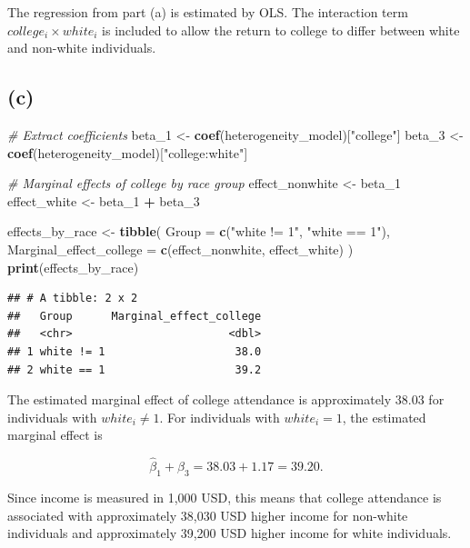 \documentclass[
]{article}
\newenvironment{Shaded}{\begin{snugshade}}{\end{snugshade}}
\newcommand{\AttributeTok}[1]{\textcolor[rgb]{0.13,0.29,0.53}{#1}}
\newcommand{\CommentTok}[1]{\textcolor[rgb]{0.56,0.35,0.01}{\textit{#1}}}
\newcommand{\FunctionTok}[1]{\textcolor[rgb]{0.13,0.29,0.53}{\textbf{#1}}}
\newcommand{\NormalTok}[1]{#1}
\newcommand{\OtherTok}[1]{\textcolor[rgb]{0.56,0.35,0.01}{#1}}
\newcommand{\SpecialCharTok}[1]{\textcolor[rgb]{0.81,0.36,0.00}{\textbf{#1}}}
\newcommand{\StringTok}[1]{\textcolor[rgb]{0.31,0.60,0.02}{#1}}
\begin{document}
The regression from part (a) is estimated by OLS. The interaction term
\(college_i \times white_i\) is included to allow the return to college
to differ between white and non-white individuals.

\subsection{(c)}\label{c-1}

\begin{Shaded}
\begin{Highlighting}[]
\CommentTok{\# Extract coefficients}
\NormalTok{beta\_1 }\OtherTok{\textless{}{-}} \FunctionTok{coef}\NormalTok{(heterogeneity\_model)[}\StringTok{"college"}\NormalTok{]}
\NormalTok{beta\_3 }\OtherTok{\textless{}{-}} \FunctionTok{coef}\NormalTok{(heterogeneity\_model)[}\StringTok{"college:white"}\NormalTok{]}

\CommentTok{\# Marginal effects of college by race group}
\NormalTok{effect\_nonwhite }\OtherTok{\textless{}{-}}\NormalTok{ beta\_1}
\NormalTok{effect\_white }\OtherTok{\textless{}{-}}\NormalTok{ beta\_1 }\SpecialCharTok{+}\NormalTok{ beta\_3}

\NormalTok{effects\_by\_race }\OtherTok{\textless{}{-}} \FunctionTok{tibble}\NormalTok{(}
  \AttributeTok{Group =} \FunctionTok{c}\NormalTok{(}\StringTok{"white != 1"}\NormalTok{, }\StringTok{"white == 1"}\NormalTok{),}
  \AttributeTok{Marginal\_effect\_college =} \FunctionTok{c}\NormalTok{(effect\_nonwhite, effect\_white)}
\NormalTok{)}
 \FunctionTok{print}\NormalTok{(effects\_by\_race)}
\end{Highlighting}
\end{Shaded}

\begin{verbatim}
## # A tibble: 2 x 2
##   Group      Marginal_effect_college
##   <chr>                        <dbl>
## 1 white != 1                    38.0
## 2 white == 1                    39.2
\end{verbatim}

The estimated marginal effect of college attendance is approximately
\(38.03\) for individuals with \(white_i \neq 1\). For individuals with
\(white_i = 1\), the estimated marginal effect is

\[
\hat{\beta}_1 + \hat{\beta}_3 = 38.03 + 1.17 = 39.20.
\]

Since income is measured in 1,000 USD, this means that college
attendance is associated with approximately 38,030 USD higher income for
non-white individuals and approximately 39,200 USD higher income for
white individuals.
\end{document}
